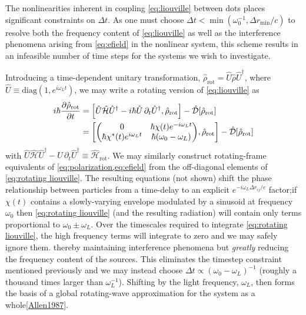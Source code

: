 \documentclass[conference]{IEEEtran}
\begin{document}
The nonlinearities inherent in coupling \cref{eq:liouville} between dots places significant constraints on $\Delta t$.
As one must choose $\Delta t < \min(\omega_0^{-1}, \Delta r_\text{min}/c)$ to resolve both the frequency content of \cref{eq:liouville} as well as the interference phenomena arising from \cref{eq:efield} in the nonlinear system, this scheme results in an infeasible number of time steps for the systems we wish to investigate.

Introducing a time-dependent unitary transformation, $\hat{\rho}_\text{rot} = \hat{U}\hat{\rho}\hat{U}^\dagger$, where $\hat{U} \equiv \text{diag}(1, e^{i \omega_L t})$,
we may write a rotating version of \cref{eq:liouville} as
\begin{equation}
  \begin{aligned}
    i \hbar \pdv{\hat{\rho}_\text{rot}}{t} &= \commutator{\hat{U} \hat{\mathcal{H}} \hat{U}^\dagger - i \hbar \hat{U} \, \partial_t \hat{U}^\dagger}{\hat{\rho}_\text{rot}} - \hat{\mathcal{D}}[\hat{\rho}_\text{rot}] \\
    &= \commutator{\mqty(0 & \hbar \chi(t)e^{-i \omega_L t} \\ \hbar \chi^*(t) e^{i \omega_L t} & \hbar\qty(\omega_0 - \omega_L))}{\hat{\rho}_\text{rot}} - \hat{\mathcal{D}}[\hat{\rho}_\text{rot}]
  \end{aligned}
  \label{eq:rotating liouville}
\end{equation}
with $\hat{U} \hat{\mathcal{H}} \hat{U}^\dagger - \hat{U} \, \partial_t \hat{U}^\dagger \equiv \hat{\mathcal{H}}_\text{rot}$.
We may similarly construct rotating-frame equivalents of \cref{eq:polarization,eq:efield} from the off-diagonal elements of \cref{eq:rotating liouville}.
The resulting equations (not shown) shift the phase relationship between particles from a time-delay to an explicit $e^{-i \omega_L \Delta r_{ij}/c}$ factor;if $\chi(t)$ contains a slowly-varying envelope modulated by a sinusoid at frequency $\omega_0$ then \cref{eq:rotating liouville} (and the resulting radiation) will contain only terms proportional to $\omega_0 \pm \omega_L$.
Over the timescales required to integrate \cref{eq:rotating liouville}, the high frequency terms will integrate to zero and we may safely ignore them.
 thereby maintaining interference phenomena but \emph{greatly} reducing the frequency content of the sources.
This eliminates the timestep constraint mentioned previously and we may instead choose $\Delta t \propto (\omega_0 - \omega_L)^{-1}$ (roughly a thousand times larger than $\omega_L^{-1}$).
Shifting by the light frequency, $\omega_L$, then forms the basis of a global rotating-wave approximation for the system as a whole\cref{Allen1987}.
\end{document}
